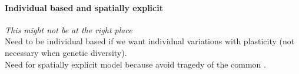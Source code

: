 %
% 
%
%
%
%
%
%



\paragraph{Individual based and spatially explicit}
\textit{This might not be at the right place}\\
Need to be individual based if we want individual variations with plasticity (not necessary when genetic diversity). \\
Need for spatially explicit model because avoid tragedy of the common \cite{farrior_competitive_2014}.

